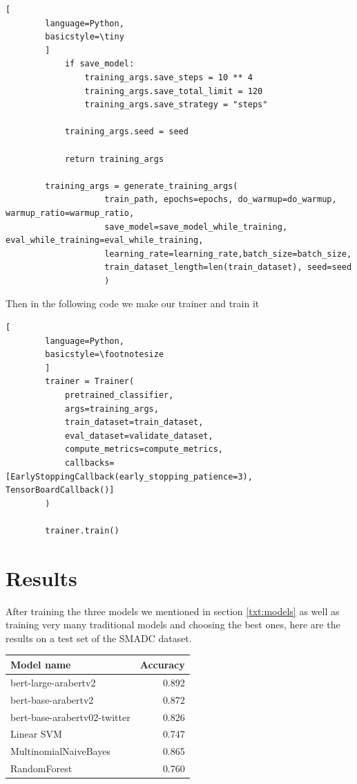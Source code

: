 \documentclass[12pt]{diazessay}
\begin{document}
\begin{lstlisting}[
        language=Python,
        basicstyle=\tiny
        ]
            if save_model:
                training_args.save_steps = 10 ** 4
                training_args.save_total_limit = 120
                training_args.save_strategy = "steps"
        
            training_args.seed = seed
        
            return training_args
            
        training_args = generate_training_args(
                    train_path, epochs=epochs, do_warmup=do_warmup, warmup_ratio=warmup_ratio, 
                    save_model=save_model_while_training, eval_while_training=eval_while_training, 
                    learning_rate=learning_rate,batch_size=batch_size, 
                    train_dataset_length=len(train_dataset), seed=seed
                    )
    \end{lstlisting}
    
    Then in the following code we make our trainer and train it
    \begin{lstlisting}[
        language=Python,
        basicstyle=\footnotesize
        ]
        trainer = Trainer(
            pretrained_classifier,
            args=training_args,
            train_dataset=train_dataset,
            eval_dataset=validate_dataset,
            compute_metrics=compute_metrics,
            callbacks=[EarlyStoppingCallback(early_stopping_patience=3), TensorBoardCallback()]
        )
        
        trainer.train()
    \end{lstlisting}
    
    
    \section {Results}
    After training the three models we mentioned in section \ref{txt:models} as well as training very many traditional models and choosing the best ones, here are the results on a test set of the SMADC dataset.
    \vskip0.5cm
    \hskip1.7cm
    \begin{tabular}{lr}
        \toprule
        Model name & Accuracy \\
        \midrule
        bert-large-arabertv2 &        0.892 \\
        bert-base-arabertv2 &        0.872 \\
        bert-base-arabertv02-twitter  & 0.826 \\
        Linear SVM            &          0.747 \\
        MultinomialNaiveBayes &          0.865 \\
        RandomForest          &           0.760 \\
        \bottomrule
    \end{tabular}
    
\end{document}
